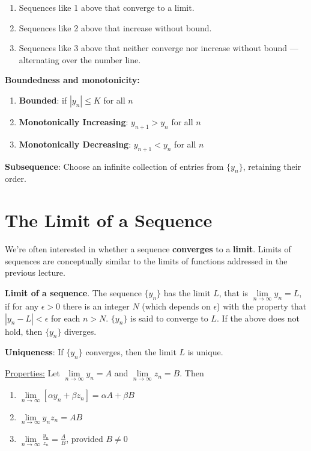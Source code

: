 \documentclass[]{book}
\providecommand{\tightlist}{%
  \setlength{\itemsep}{0pt}\setlength{\parskip}{0pt}}
\theoremstyle{definition}
\theoremstyle{definition}
\theoremstyle{definition}
\theoremstyle{remark}
\begin{document}
\begin{enumerate}
\def\labelenumi{\arabic{enumi}.}
\tightlist
\item
  Sequences like 1 above that converge to a limit.
\item
  Sequences like 2 above that increase without bound.
\item
  Sequences like 3 above that neither converge nor increase without
  bound --- alternating over the number line.
\end{enumerate}

\textbf{Boundedness and monotonicity:}

\begin{enumerate}
\def\labelenumi{\arabic{enumi}.}
\tightlist
\item
  \textbf{Bounded}: if \(|y_n|\le K\) for all \(n\)
\item
  \textbf{Monotonically Increasing}: \(y_{n+1}>y_n\) for all \(n\)
\item
  \textbf{Monotonically Decreasing}: \(y_{n+1}<y_n\) for all \(n\)
\end{enumerate}

\textbf{Subsequence}: Choose an infinite collection of entries from
\(\{ y_n \}\), retaining their order.

\section{The Limit of a Sequence}\label{the-limit-of-a-sequence}

We're often interested in whether a sequence \textbf{converges} to a
\textbf{limit}. Limits of sequences are conceptually similar to the
limits of functions addressed in the previous lecture.

\textbf{Limit of a sequence}. The sequence \(\{y_n\}\) has the limit
\(L\), that is \(\lim\limits_{n \to \infty} y_n =L\), if for any
\(\epsilon>0\) there is an integer \(N\) (which depends on \(\epsilon\))
with the property that \(|y_n -L|<\epsilon\) for each \(n>N\).
\(\{y_n\}\) is said to converge to \(L\). If the above does not hold,
then \(\{y_n\}\) diverges.

\textbf{Uniqueness}: If \(\{y_n\}\) converges, then the limit \(L\) is
unique.

\underline{Properties:} Let \(\lim\limits_{n \to \infty} y_n = A\) and
\(\lim\limits_{n \to \infty} z_n =B\). Then

\begin{enumerate}
        \item $\lim\limits_{n \to \infty} [\alpha y_n + \beta z_n]=\alpha A+\beta B$
        \item $\lim\limits_{n \to \infty} y_n z_n = A B$
        \item $\lim\limits_{n \to \infty} \frac{y_n}{z_n} = \frac{A}{B}$, provided $B\ne 0$
\end{enumerate}
\end{document}
